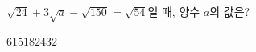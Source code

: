 $\sqrt{24}+3\sqrt{a}-\sqrt{150}=\sqrt{54}$일 때, 양수 $a$의 값은?
\begin{choices32}{$6$}{$15$}{$18$}{$24$}{$32$}\end{choices32}
